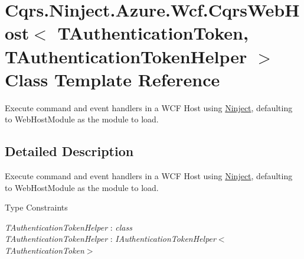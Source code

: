 \hypertarget{classCqrs_1_1Ninject_1_1Azure_1_1Wcf_1_1CqrsWebHost}{}\section{Cqrs.\+Ninject.\+Azure.\+Wcf.\+Cqrs\+Web\+Host$<$ T\+Authentication\+Token, T\+Authentication\+Token\+Helper $>$ Class Template Reference}
\label{classCqrs_1_1Ninject_1_1Azure_1_1Wcf_1_1CqrsWebHost}


Execute command and event handlers in a W\+CF Host using \hyperlink{namespaceCqrs_1_1Ninject}{Ninject}, defaulting to Web\+Host\+Module as the module to load.  




\subsection{Detailed Description}
Execute command and event handlers in a W\+CF Host using \hyperlink{namespaceCqrs_1_1Ninject}{Ninject}, defaulting to Web\+Host\+Module as the module to load. 

\begin{Desc}
\item[Type Constraints]\begin{description}
\item[{\em T\+Authentication\+Token\+Helper} : {\em class}]\item[{\em T\+Authentication\+Token\+Helper} : {\em I\+Authentication\+Token\+Helper$<$T\+Authentication\+Token$>$}]\end{description}
\end{Desc}
